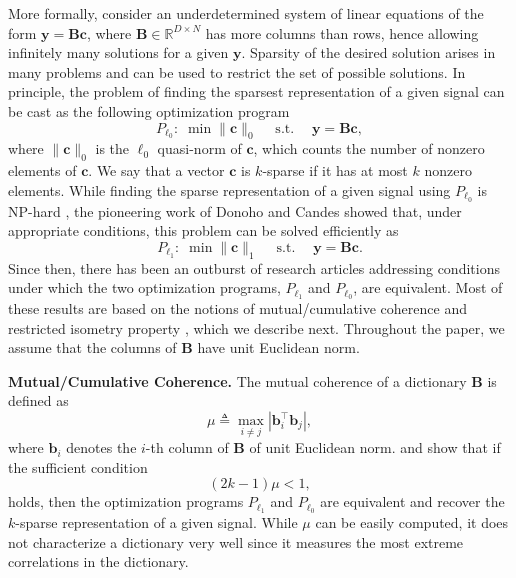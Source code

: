 \documentclass[10pt,twocolumn,twoside] {IEEEtran}
\begin{document}
More formally, consider an underdetermined system of linear equations of the form ${\boldsymbol{y}} = {\boldsymbol{B}} {\boldsymbol{c}}$, where ${\boldsymbol{B}} \in {\mathbb{R}}^{D \times N}$ has more columns than rows, hence allowing infinitely many solutions for a given ${\boldsymbol{y}}$.  Sparsity of the desired solution  
arises in many problems and can be used to restrict the set of possible solutions. In principle, the problem of finding the sparsest representation of a given signal can be cast as the following optimization program 
\begin{equation}
\label{eq:PL0}
P_{\ell_0}: \; \min \| {\boldsymbol{c}} \|_0 \quad {\operatorname{s. t.}} \quad {\boldsymbol{y}} = {\boldsymbol{B}} {\boldsymbol{c}} ,
\end{equation}
where $\| {\boldsymbol{c}} \|_0$ is the $\ell_0$ quasi-norm of ${\boldsymbol{c}}$, which counts the number of nonzero elements of ${\boldsymbol{c}}$. We say that a vector ${\boldsymbol{c}}$ is $k$-sparse if it has at most $k$ nonzero elements. While finding the sparse representation of a given signal using $P_{\ell_0}$ is NP-hard \cite{Amaldi:TCS98}, the pioneering work of Donoho \cite{Donoho:CPAM06} and Candes \cite{Candes-Tao:TIT05} showed that, under appropriate conditions, this problem can be solved efficiently as\!
\begin{equation}
\label{eq:PL1}
P_{\ell_1}: \; \min \| {\boldsymbol{c}} \|_1 \quad {\operatorname{s. t.}} \quad {\boldsymbol{y}} = {\boldsymbol{B}} {\boldsymbol{c}}.
\end{equation}
Since then, there has been an outburst of research articles addressing conditions under which the two optimization programs, $P_{\ell_1}$ and $P_{\ell_0}$, are equivalent. Most of these results are based on the notions of mutual/cumulative coherence \cite{Tropp:TIT04, Donoho:TIT06} and restricted isometry property \cite{Candes-Tao:TIT05, Candes:CRAS08}, which we describe next. Throughout the paper, we assume that the columns of ${\boldsymbol{B}}$ have unit Euclidean norm.

{\medskip\noindent\textbf{{Mutual/Cumulative Coherence}.} } 
The mutual coherence of a dictionary ${\boldsymbol{B}}$ is defined as 
\begin{equation}
\label{eq:mutcoh}
\mu \triangleq \max_{i \neq j} | {\boldsymbol{b}}_i^{\top} {\boldsymbol{b}}_j |,
\end{equation}
where ${\boldsymbol{b}}_i$ denotes the $i$-th column of ${\boldsymbol{B}}$ of unit Euclidean norm. \cite{Tropp:TIT04} and \cite{Donoho:TIT06} show that if the sufficient condition 
\begin{equation}
\label{eq:mut-coh-conventional}
(2k-1) \mu < 1,
\end{equation} 
holds, then the optimization programs $P_{\ell_1}$ and $P_{\ell_0}$ are equivalent and recover the $k$-sparse representation of a given signal. While $\mu$ can be easily computed, it does not characterize a dictionary very well since it measures the most extreme correlations in the dictionary. 
\end{document}
